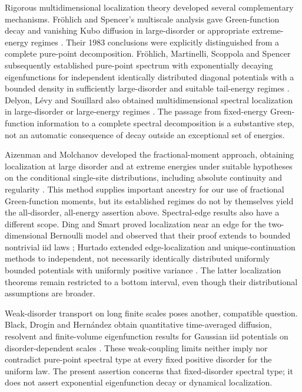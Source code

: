 Rigorous multidimensional localization theory developed several
complementary mechanisms.
Fr\"ohlich and Spencer's multiscale analysis gave Green-function decay
and vanishing Kubo diffusion in large-disorder or appropriate
extreme-energy regimes \cite{FrohlichSpencer1983}. Their 1983
conclusions were explicitly distinguished from a complete pure-point
decomposition. Fr\"ohlich, Martinelli, Scoppola and Spencer subsequently
established pure-point spectrum with exponentially decaying
eigenfunctions for independent identically distributed diagonal
potentials with a bounded density in sufficiently large-disorder and suitable tail-energy
regimes \cite{FMSS1985}. Delyon, L\'evy and Souillard also obtained
multidimensional spectral localization in large-disorder or large-energy
regimes \cite{DelyonLevySouillard1985}. The passage from fixed-energy
Green-function information to a complete spectral decomposition is a
substantive step, not an automatic consequence of decay outside an
exceptional set of energies.

Aizenman and Molchanov developed the fractional-moment approach,
obtaining localization at large disorder and at extreme energies under
suitable hypotheses on the conditional single-site distributions,
including absolute continuity and regularity
\cite{AizenmanMolchanov1993}. This method supplies important ancestry for
our use of fractional Green-function moments, but its established
regimes do not by themselves yield the all-disorder, all-energy
assertion above. Spectral-edge results also have a different scope.
Ding and Smart proved localization near an edge for the two-dimensional
Bernoulli model and observed that their proof extends to bounded
nontrivial iid laws
\cite{DingSmart2020}; Hurtado extended edge-localization and
unique-continuation methods to independent, not necessarily identically
distributed uniformly bounded potentials with uniformly positive variance
\cite{Hurtado2026}. The latter
localization theorems remain restricted to a bottom interval, even
though their distributional assumptions are broader.

Weak-disorder transport on long finite scales poses another, compatible
question. Black, Drogin and Hern\'andez obtain quantitative time-averaged
diffusion, resolvent and finite-volume eigenfunction results for
Gaussian iid potentials on disorder-dependent scales
\cite{BlackDroginHernandez2025}.
These weak-coupling limits neither imply nor contradict pure-point
spectral type at every fixed positive disorder for the uniform law.
The present assertion concerns that fixed-disorder spectral type; it
does not assert exponential eigenfunction decay or dynamical localization.

